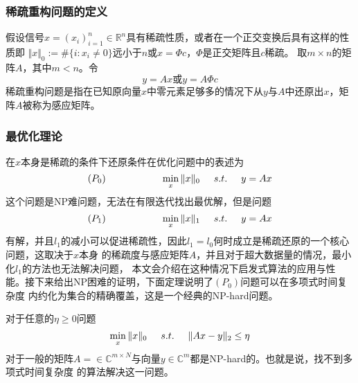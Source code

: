 \subsubsection{稀疏重构问题的定义}
假设信号$x=\left(x_i\right)^n_{i=1}\in \mathbb{R}^n$具有稀疏性质，或者在一个正交变换后具有这样的性质即
$\Vert x\Vert_0:=\# \{i:x_i \neq 0\}$远小于$n$或$x=\Phi c$，$\Phi$是正交矩阵且$c$稀疏。
取$m\times n$的矩阵$A$，其中$m<n$。令
\begin{equation}
    y=Ax\text{或}y=A\Phi c
\end{equation}
稀疏重构问题是指在已知原向量$x$中零元素足够多的情况下从$y$与$A$中还原出$x$，矩阵$A$被称为感应矩阵。

\subsubsection{最优化理论}
在$x$本身是稀疏的条件下还原条件在优化问题中的表述为
\begin{equation}
    \left( P_0\right) \hspace{2cm}\min_x\Vert x\Vert_0\hspace{0.5cm} s.t.\hspace{0.5cm} y=Ax
\end{equation}
这个问题是NP难问题，无法在有限迭代找出最优解，但是问题
\begin{equation}
    \left( P_1\right) \hspace{2cm}\min_x\Vert x\Vert_1\hspace{0.5cm} s.t.\hspace{0.5cm} y=Ax
\end{equation}
有解，并且$l_1$的减小可以促进稀疏性，因此$l_1=l_0$何时成立是稀疏还原的一个核心问题，这取决于$x$本身
的稀疏度与感应矩阵$A$，并且对于超大数据量的情况，最小化$l_1$的方法也无法解决问题，
本文会介绍在这种情况下启发式算法的应用与性能。接下来给出NP困难的证明，下面定理说明了$(P_0)$问题可以在多项式时间复杂度
内约化为集合的精确覆盖，这是一个经典的NP-hard问题。
\begin{theorem}
    对于任意的$\eta\ge 0$问题
    \begin{equation}
        \min_x\Vert x\Vert_0\hspace{0.5cm} s.t.\hspace{0.5cm} \Vert Ax-y\Vert_2\le \eta
    \end{equation}
    对于一般的矩阵$A=\in\mathbb{C}^{m \times N}$与向量$y\in\mathbb{C}^m$都是NP-hard的。也就是说，找不到多项式时间复杂度
    的算法解决这一问题。
\end{theorem}

